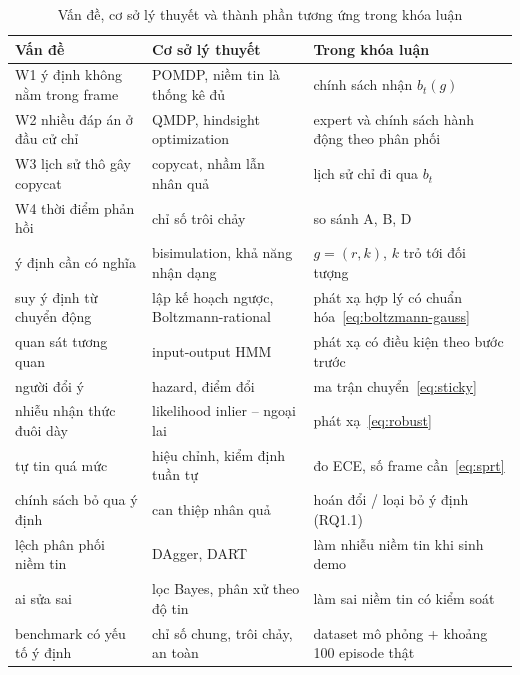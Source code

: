 \begin{table}[H]
  \centering
  \caption{Vấn đề, cơ sở lý thuyết và thành phần tương ứng trong khóa luận}
  \label{tab:bg-limitations}
  \small
  \begin{tabularx}{\textwidth}{@{}>{\raggedright\arraybackslash}p{3.4cm}>{\raggedright\arraybackslash}X>{\raggedright\arraybackslash}p{3.8cm}@{}}
    \toprule
    Vấn đề & Cơ sở lý thuyết & Trong khóa luận \\
    \midrule
    W1 ý định không nằm trong frame & POMDP, niềm tin là thống kê đủ~\cite{kaelbling1998planning,ong2010momdp} & chính sách nhận $b_t(g)$ \\
    W2 nhiều đáp án ở đầu cử chỉ & QMDP, hindsight optimization~\cite{littman1995learning,javdani2018shared} & expert và chính sách hành động theo phân phối \\
    W3 lịch sử thô gây copycat & copycat, nhầm lẫn nhân quả~\cite{wen2020copycat,dehaan2019causal} & lịch sử chỉ đi qua $b_t$ \\
    W4 thời điểm phản hồi & chỉ số trôi chảy~\cite{hoffman2019fluency} & so sánh A, B, D \\
    ý định cần có nghĩa & bisimulation, khả năng nhận dạng~\cite{givan2003equivalence,locatello2019challenging} & $g=(r,k)$, $k$ trỏ tới đối tượng \\
    suy ý định từ chuyển động & lập kế hoạch ngược, Boltzmann-rational~\cite{baker2009inverse,ziebart2008maxent} & phát xạ hợp lý có chuẩn hóa~\eqref{eq:boltzmann-gauss} \\
    quan sát tương quan & input-output HMM~\cite{bengio1995iohmm} & phát xạ có điều kiện theo bước trước \\
    người đổi ý & hazard, điểm đổi~\cite{fox2011sticky,fearnhead2007online} & ma trận chuyển~\eqref{eq:sticky} \\
    nhiễu nhận thức đuôi dày & likelihood inlier -- ngoại lai~\cite{torr2000mlesac} & phát xạ~\eqref{eq:robust} \\
    tự tin quá mức & hiệu chỉnh, kiểm định tuần tự~\cite{guo2017calibration,wald1945sequential} & đo ECE, số frame cần~\eqref{eq:sprt} \\
    chính sách bỏ qua ý định & can thiệp nhân quả~\cite{dehaan2019causal} & hoán đổi / loại bỏ ý định (RQ1.1) \\
    lệch phân phối niềm tin & DAgger, DART~\cite{ross2011dagger,laskey2017dart} & làm nhiễu niềm tin khi sinh demo \\
    ai sửa sai & lọc Bayes, phân xử theo độ tin~\cite{dragan2013blending} & làm sai niềm tin có kiểm soát \\
    benchmark có yếu tố ý định & chỉ số chung, trôi chảy, an toàn~\cite{steinfeld2006metrics,hoffman2019fluency,iso15066} & dataset mô phỏng + khoảng 100 episode thật \\
    \bottomrule
  \end{tabularx}
\end{table}

